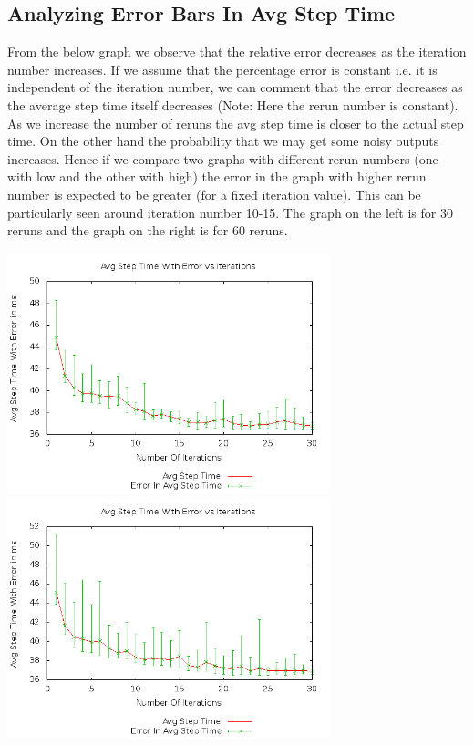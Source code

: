 \documentclass[11pt]{article}
\begin{document}
	\subsection{Analyzing Error Bars In Avg Step Time}
	From the below graph we observe that the relative error decreases as the iteration number increases. If we assume that the percentage error is constant i.e. it is independent of the iteration number, we can comment that the error decreases as the average step time itself decreases (Note: Here the rerun number is constant).
	As we increase the number of reruns the avg step time is closer to the actual step time. On the other hand the probability that we may get some noisy outputs increases. Hence if we compare two graphs with different rerun numbers (one with low and the other with high) the error in the graph with higher rerun number is expected to be greater (for a fixed iteration value). This can be particularly seen around iteration number 10-15. The graph on the left is for 30 reruns and the graph on the right is for 60 reruns. \newline

		\begin{center}\includegraphics[height=7cm]{30_30_plot03.png}\includegraphics[height=7cm]{30_60_plot03.png}\end{center}
	
\end{document}
